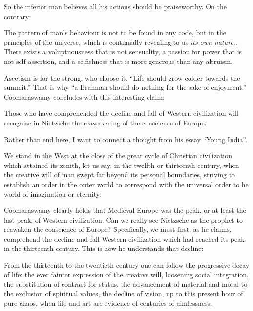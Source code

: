 So the inferior man believes all his actions should be praiseworthy. On the contrary:

\begin{quotex}
The pattern of man's behaviour is not to be found in any code, but in the principles of the universe, which is continually revealing to us \emph{its own nature}... There exists a voluptuousness that is not sensuality, a passion for power that is not self-assertion, and a selfishness that is more generous than any altruism.
\end{quotex}


Ascetism is for the strong, who choose it. ``Life should grow colder towards the summit.'' That is why ``a Brahman should do nothing for the sake of enjoyment.'' Coomaraswamy concludes with this interesting claim:

\begin{quotex}
Those who have comprehended the decline and fall of Western civilization will recognize in Nietzsche the reawakening of the conscience of Europe.
\end{quotex}


Rather than end here, I want to connect a thought from his essay ``Young India''.

\begin{quotex}
We stand in the West at the close of the great cycle of Christian civilization which attained its zenith, let us say, in the twelfth or thirteenth century, when the creative will of man swept far beyond its personal boundaries, striving to establish an order in the outer world to correspond with the universal order to he world of imagination or eternity.
\end{quotex}


Coomaraswamy clearly holds that Medieval Europe was the peak, or at least the last peak, of Western civilization. Can we really see Nietzsche as the prophet to reawaken the conscience of Europe? Specifically, we must first, as he claims, comprehend the decline and fall Western civilization which had reached its peak in the thirteenth century. This is how he understands that decline:

\begin{quotex}
From the thirteenth to the twentieth century one can follow the progressive decay of life: the ever fainter expression of the creative will, loosening social integration, the substitution of contract for status, the advancement of material and moral to the exclusion of spiritual values, the decline of vision, up to this present hour of pure chaos, when life and art are evidence of centuries of aimlessness.
\end{quotex}



